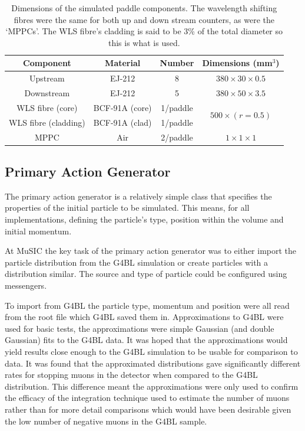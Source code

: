 \begin{table}
  \begin{center}
  \begin{tabular}{c | c | c | c}
    Component      & Material         & Number     &  Dimensions (mm\(^3\)) \\
    \hline
    Upstream              &  EJ-212          &  8         &  \(380\times30\times0.5 \) \\
    Downstream            &  EJ-212          &  5         &  \(380\times50\times3.5 \) \\
    WLS fibre (core)      &  BCF-91A (core)  &  1/paddle  &  
                                        \multirow{2}{*}{\(500\times(r=0.5)\)} \\
    WLS fibre (cladding)  &  BCF-91A (clad)  &  1/paddle  &  \\
    MPPC                  &  Air             &  2/paddle  &  \(1\times1\times1 \) \\
  \end{tabular}
  \end{center}
  \caption{Dimensions of the simulated paddle components. The wavelength shifting fibres were the same for both up and down stream counters, as were the `MPPCs'. The WLS fibre's cladding is said to be 3\% of the total diameter so this is what is used.}
  \label{tab:dimensions_of_paddles}
\end{table}

\subsection{Primary Action Generator} %
\label{sec:primary_action_generator}
The primary action generator is a relatively simple class that specifies the properties of the initial particle to be simulated. This means, for all implementations, defining the particle's type, position within the volume and initial momentum. 

At MuSIC the key task of the primary action generator was to either import the particle distribution from the G4BL simulation or create particles with a distribution similar. The source and type of particle could be configured using messengers.

To import from G4BL the particle type, momentum and position were all read from the root file which G4BL saved them in. Approximations to G4BL were used for basic tests, the approximations were simple Gaussian (and double Gaussian) fits to the G4BL data. It was hoped that the approximations would yield results close enough to the G4BL simulation to be usable for comparison to data. It was found that the approximated distributions gave significantly different rates for stopping muons in the detector when compared to the G4BL distribution. This difference meant the approximations were only used to confirm the efficacy of the integration technique used to estimate the number of muons rather than for more detail comparisons which would have been desirable given the low number of negative muons in the G4BL sample. 

